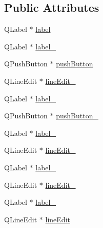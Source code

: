 \subsection*{Public Attributes}
\begin{DoxyCompactItemize}
\item 
Q\-Label $\ast$ \hyperlink{class_ui___main_dialog_a383727ac19a1ff1f715444ec233216b2}{label}
\item 
Q\-Label $\ast$ \hyperlink{class_ui___main_dialog_a910b8a9e482ff4918ac710fa212daf6a}{label\-\_}
\item 
Q\-Push\-Button $\ast$ \hyperlink{class_ui___main_dialog_ae43161e4541a8f071818ed7078f37d17}{push\-Button}
\item 
Q\-Line\-Edit $\ast$ \hyperlink{class_ui___main_dialog_af9dd85aabf29bd9a7a6583650b2cb3a6}{line\-Edit\-\_}
\item 
Q\-Label $\ast$ \hyperlink{class_ui___main_dialog_ae6d3ed8e0ecd02b33a8e882bcf76736e}{label\-\_}
\item 
Q\-Push\-Button $\ast$ \hyperlink{class_ui___main_dialog_a1e36704d648c5eff2f39361358473177}{push\-Button\-\_}
\item 
Q\-Label $\ast$ \hyperlink{class_ui___main_dialog_a17f2c641b9bc25d74908ca0e1be1d1ed}{label\-\_}
\item 
Q\-Line\-Edit $\ast$ \hyperlink{class_ui___main_dialog_a795bf26e2acfd4b9ac9defe7d42c3864}{line\-Edit\-\_}
\item 
Q\-Label $\ast$ \hyperlink{class_ui___main_dialog_a3aedc712668220620207e924070d71c5}{label\-\_}
\item 
Q\-Line\-Edit $\ast$ \hyperlink{class_ui___main_dialog_a977eddf56dfec6c6de86971e96500999}{line\-Edit\-\_}
\item 
Q\-Label $\ast$ \hyperlink{class_ui___main_dialog_a81c0160ba1f8d2ec3dc9bc254d8e43aa}{label\-\_}
\item 
Q\-Line\-Edit $\ast$ \hyperlink{class_ui___main_dialog_a34d1635f999d56efbd5e7b068dfc6a0d}{line\-Edit}
\end{DoxyCompactItemize}


